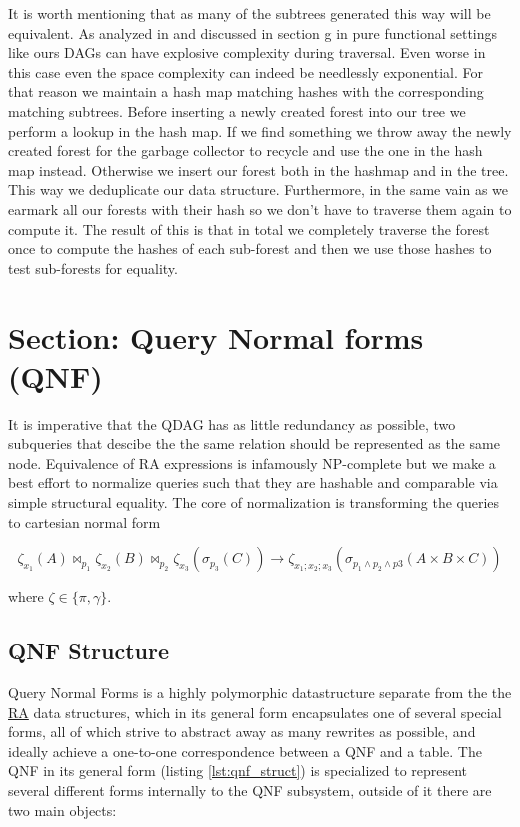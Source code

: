 It is worth mentioning that as many of the subtrees generated this way
will be equivalent. As analyzed in \cite{bibtexa} and discussed in
section g in pure functional settings like ours DAGs can have
explosive complexity during traversal. Even worse in this case even
the space complexity can indeed be needlessly exponential. For that
reason we maintain a hash map matching hashes with the corresponding
matching subtrees. Before inserting a newly created forest into our
tree we perform a lookup in the hash map. If we find something we
throw away the newly created forest for the garbage collector to
recycle and use the one in the hash map instead. Otherwise we insert
our forest both in the hashmap and in the tree. This way we
deduplicate our data structure. Furthermore, in the same vain as
\cite{bibtexa} we earmark all our forests with their hash so we don't
have to traverse them again to compute it. The result of this is that
in total we completely traverse the forest once to compute the hashes
of each sub-forest and then we use those hashes to test sub-forests
for equality.

\section{Section: Query Normal forms (QNF)}
\label{sec:qnf}

It is imperative that the QDAG has as little redundancy as possible,
two subqueries that descibe the the same relation should be
represented as the same node. Equivalence of RA expressions is
infamously NP-complete
\cite{sagivEquivalencesRelationalExpressions1980} but we make a best
effort to normalize queries such that they are hashable and comparable
via simple structural equality. The core of normalization is
transforming the queries to cartesian normal form

\[
  \zeta_{x_1}(A) \Join_{p_1} \zeta_{x_2}(B) \Join_{p_2} \zeta_{x_3} (\sigma_{p_3}(C)) \to \zeta_{x_1;x_2;x_3}(\sigma_{p_1 \land p_2 \land p3}(A \times B \times C))
\]

where \(\zeta \in \{\pi,\gamma\}\).


\subsection{QNF Structure}

Query Normal Forms is a highly polymorphic datastructure separate from
the the \hyperref[sec:relational_algebra_semantics]{RA} data structures, which in its general form encapsulates one
of several special forms, all of which strive to abstract away as many
rewrites as possible, and ideally achieve a one-to-one correspondence
between a QNF and a table. The QNF in its general form (listing
\ref{lst:qnf_struct}) is specialized to represent several different forms
internally to the QNF subsystem, outside of it there are two main
objects:

